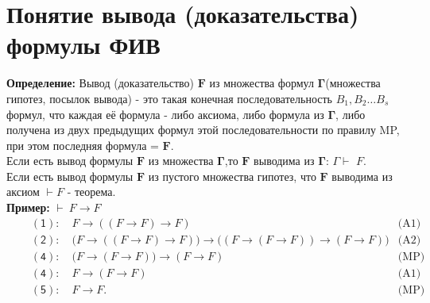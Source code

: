 \documentclass[../main.tex]{subfiles}
\begin{document}
\section{Понятие вывода (доказательства) формулы ФИВ}
\textbf{Определение:
}Вывод (доказательство) $\mathbf{F}$ из множества формул $\mathbf{\Gamma}$(множества гипотез, посылок вывода) - это такая конечная последовательность $B_1,B_2\ldots B_s$ формул, что каждая её формула - либо аксиома, либо формула из $\mathbf{\Gamma}$, либо получена из двух предыдущих формул этой последовательности по правилу MP, при этом последняя формула = $\mathbf{F}$. \\
Если есть вывод формулы $\mathbf{F}$ из множества $\mathbf{\Gamma}$,то $\mathbf{F}$ выводима из $\mathbf{\Gamma}$: $\Gamma\vdash$ $F$. \\
Если есть вывод формулы $\mathbf{F}$ из пустого множества гипотез, что $\mathbf{F}$ выводима из аксиом $\vdash F$ - теорема. \\
\textbf{Пример:
} $\vdash \ F \to F$
\begin{align*}
	\quad&\mathsf{(1)}\colon\quad F\to ((F\to F)\to F)															&\text{(A1)}\\
	\quad&\mathsf{(2)}\colon\quad \bigl(F\to ((F\to F)\to F)\bigr)\to \bigl((F\to (F\to F)) \to (F\to F)\bigr) 	&\text{(A2)}\\
	\quad&\mathsf{(4)}\colon\quad \bigl(F\to (F\to F)\bigr)\to (F\to F) 										&\text{(MP)}\\
	\quad&\mathsf{(4)}\colon\quad F\to (F\to F) 																&\text{(A1)}\\
	\quad&\mathsf{(5)}\colon\quad F\to F. 																		&\text{(MP)}
\end{align*}

\end{document}
